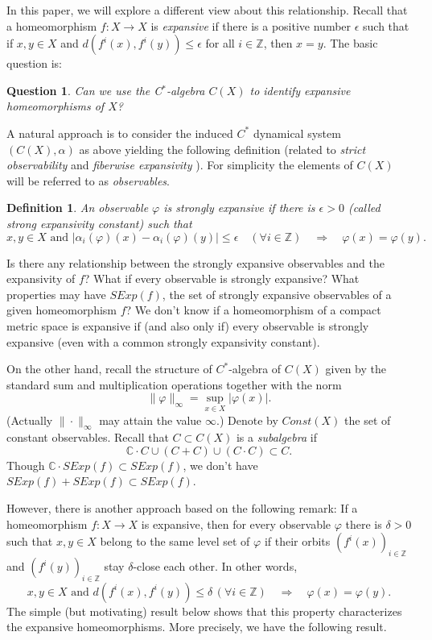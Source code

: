 \documentclass[11pt,letterpaper]{amsart}
\newtheorem{question}{Question}
\newtheorem{definition}{Definition}
\begin{document}
In this paper, we will explore a different view about this relationship.
Recall that a homeomorphism $f:X\to X$ is {\em expansive} if
there is a positive number
$\epsilon$ such that if $x,y\in X$ and $d(f^i(x),f^i(y))\leq \epsilon$ for all $i\in\mathbb{Z}$, then $x=y$.
The basic question is:
\begin{question}
Can we use the C$^*$-algebra $C(X)$ to identify expansive homeomorphisms of $X$?
\end{question}

A natural approach is to consider the induced $C^*$ dynamical system $(C(X),\alpha)$ as above yielding the following definition
(related to
{\em strict observability} \cite{AA18} and {\em fiberwise expansivity} \cite{r02}).
For simplicity the elements of $C(X)$ will be referred to as {\em observables}.


\begin{definition}
An observable $\varphi$ is {\em strongly expansive} if there is $\epsilon>0$ (called {\em strong expansivity constant}) such that
$$
x,y\in X\mbox{ and }
|\alpha_i(\varphi)(x)-\alpha_i(\varphi)(y)|\leq\epsilon\quad(\forall i\in\mathbb{Z})\quad\Longrightarrow\quad \varphi(x)=\varphi(y).
$$
\end{definition}

Is there any relationship between the strongly expansive observables and the expansivity of $f$? 
What if every observable is strongly expansive? 
What properties may have $SExp(f)$, the set of strongly expansive observables of a given homeomorphism $f$?
We don't know if a homeomorphism of a compact metric space is expansive if (and also only if) every observable is strongly expansive (even with a common strongly expansivity constant).

On the  other hand, recall the structure of $C^*$-algebra of $C(X)$ given by the standard sum and multiplication operations together with the norm
$$
\|\varphi\|_\infty=\sup_{x\in X}|\varphi(x)|.
$$
(Actually $\|\cdot\|_\infty$ may attain the value $\infty$.)
Denote by $Const(X)$ the set of constant observables.
Recall that $C\subset C(X)$ is a {\em subalgebra}
if
$$
\mathbb{C}\cdot C\cup(C+C)\cup(C\cdot C)\subset C.
$$
Though $\mathbb{C}\cdot SExp(f)\subset SExp(f)$, we don't have
$SExp(f)+SExp(f)\subset SExp(f)$.


However, there is another approach based on the following remark:
If a homeomorphism $f:X\to X$ is expansive, then for every observable $\varphi$ there is $\delta>0$ such that
$x,y\in X$ belong to the same level set of $\varphi$ if their orbits $(f^i(x))_{i\in\mathbb{Z}}$ and $(f^i(y))_{i\in\mathbb{Z}}$ stay $\delta$-close each other. In other words,
\begin{equation}
\label{papa}
x,y\in X\mbox{ and }d(f^i(x),f^i(y))\leq \delta\, (\forall i\in\mathbb{Z})
\quad\Longrightarrow\quad \varphi(x)=\varphi(y).
\end{equation}
The simple (but motivating) result below shows that this property characterizes the expansive homeomorphisms. More precisely, we have the following result.
\end{document}
